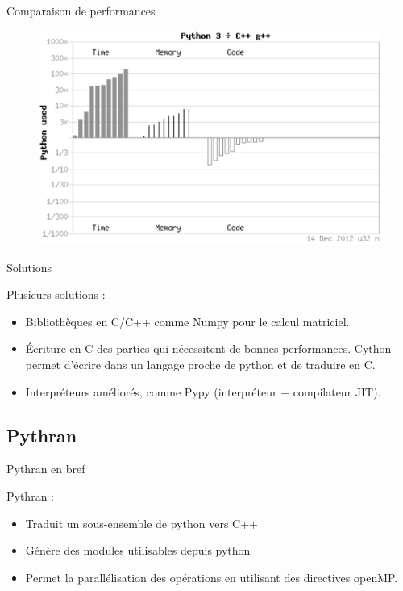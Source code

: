 \documentclass{beamer}
\begin{document}
\begin{frame}{Comparaison de performances\cite{PythonVsCpp}}

  \begin{figure}[h]
    \includegraphics[width=\textwidth]{./Pictures/pythonvscpp}
    \label{pythonvscpp}
  \end{figure}

\end{frame}

\begin{frame}{Solutions}

  Plusieurs solutions :
  \begin{itemize}
    \item Bibliothèques en C/C++ comme Numpy pour le calcul
    matriciel.  
    \item Écriture en C des parties qui nécessitent de bonnes
    performances.  Cython permet d'écrire dans un langage proche de
    python et de traduire en C.
    \item Interpréteurs améliorés, comme Pypy
    (interpréteur + compilateur JIT).
  \end{itemize}

\end{frame}

\subsection{Pythran}

\begin{frame}{Pythran en bref}

  Pythran :
  \begin{itemize}
    \item Traduit un sous-ensemble de python vers C++
    \item Génère des modules utilisables depuis python
    \item Permet la parallélisation des opérations en utilisant
    des directives openMP.
  \end{itemize}

\end{frame}
\end{document}
